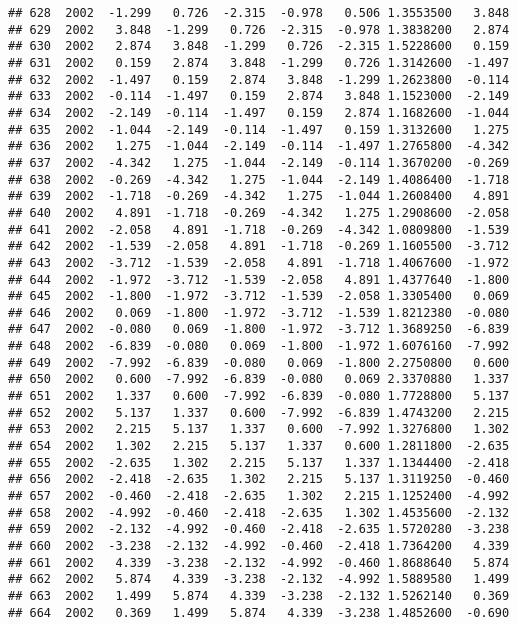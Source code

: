 \documentclass[]{article}
\begin{document}
\begin{verbatim}
## 628  2002  -1.299   0.726  -2.315  -0.978   0.506 1.3553500   3.848
## 629  2002   3.848  -1.299   0.726  -2.315  -0.978 1.3838200   2.874
## 630  2002   2.874   3.848  -1.299   0.726  -2.315 1.5228600   0.159
## 631  2002   0.159   2.874   3.848  -1.299   0.726 1.3142600  -1.497
## 632  2002  -1.497   0.159   2.874   3.848  -1.299 1.2623800  -0.114
## 633  2002  -0.114  -1.497   0.159   2.874   3.848 1.1523000  -2.149
## 634  2002  -2.149  -0.114  -1.497   0.159   2.874 1.1682600  -1.044
## 635  2002  -1.044  -2.149  -0.114  -1.497   0.159 1.3132600   1.275
## 636  2002   1.275  -1.044  -2.149  -0.114  -1.497 1.2765800  -4.342
## 637  2002  -4.342   1.275  -1.044  -2.149  -0.114 1.3670200  -0.269
## 638  2002  -0.269  -4.342   1.275  -1.044  -2.149 1.4086400  -1.718
## 639  2002  -1.718  -0.269  -4.342   1.275  -1.044 1.2608400   4.891
## 640  2002   4.891  -1.718  -0.269  -4.342   1.275 1.2908600  -2.058
## 641  2002  -2.058   4.891  -1.718  -0.269  -4.342 1.0809800  -1.539
## 642  2002  -1.539  -2.058   4.891  -1.718  -0.269 1.1605500  -3.712
## 643  2002  -3.712  -1.539  -2.058   4.891  -1.718 1.4067600  -1.972
## 644  2002  -1.972  -3.712  -1.539  -2.058   4.891 1.4377640  -1.800
## 645  2002  -1.800  -1.972  -3.712  -1.539  -2.058 1.3305400   0.069
## 646  2002   0.069  -1.800  -1.972  -3.712  -1.539 1.8212380  -0.080
## 647  2002  -0.080   0.069  -1.800  -1.972  -3.712 1.3689250  -6.839
## 648  2002  -6.839  -0.080   0.069  -1.800  -1.972 1.6076160  -7.992
## 649  2002  -7.992  -6.839  -0.080   0.069  -1.800 2.2750800   0.600
## 650  2002   0.600  -7.992  -6.839  -0.080   0.069 2.3370880   1.337
## 651  2002   1.337   0.600  -7.992  -6.839  -0.080 1.7728800   5.137
## 652  2002   5.137   1.337   0.600  -7.992  -6.839 1.4743200   2.215
## 653  2002   2.215   5.137   1.337   0.600  -7.992 1.3276800   1.302
## 654  2002   1.302   2.215   5.137   1.337   0.600 1.2811800  -2.635
## 655  2002  -2.635   1.302   2.215   5.137   1.337 1.1344400  -2.418
## 656  2002  -2.418  -2.635   1.302   2.215   5.137 1.3119250  -0.460
## 657  2002  -0.460  -2.418  -2.635   1.302   2.215 1.1252400  -4.992
## 658  2002  -4.992  -0.460  -2.418  -2.635   1.302 1.4535600  -2.132
## 659  2002  -2.132  -4.992  -0.460  -2.418  -2.635 1.5720280  -3.238
## 660  2002  -3.238  -2.132  -4.992  -0.460  -2.418 1.7364200   4.339
## 661  2002   4.339  -3.238  -2.132  -4.992  -0.460 1.8688640   5.874
## 662  2002   5.874   4.339  -3.238  -2.132  -4.992 1.5889580   1.499
## 663  2002   1.499   5.874   4.339  -3.238  -2.132 1.5262140   0.369
## 664  2002   0.369   1.499   5.874   4.339  -3.238 1.4852600  -0.690

\end{verbatim}
\end{document}
